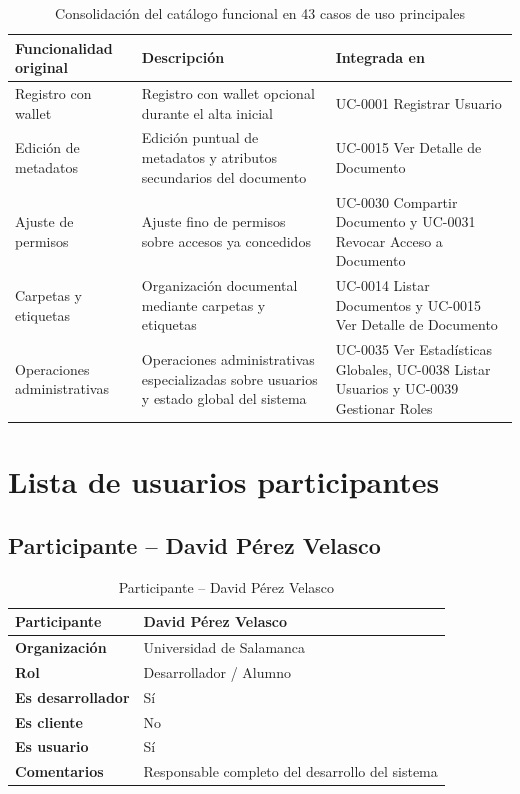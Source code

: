 \documentclass[11pt, a4paper]{article}
\begin{document}
\begin{table}[H]
    \centering
    \small
    \begin{tabular}{|p{2.6cm}|p{6.0cm}|p{5.0cm}|}
    \hline
    \textbf{Funcionalidad original} & \textbf{Descripción} & \textbf{Integrada en} \\
    \hline
    Registro con wallet & Registro con wallet opcional durante el alta inicial & UC-0001 Registrar Usuario \\
    \hline
    Edición de metadatos & Edición puntual de metadatos y atributos secundarios del documento & UC-0015 Ver Detalle de Documento \\
    \hline
    Ajuste de permisos & Ajuste fino de permisos sobre accesos ya concedidos & UC-0030 Compartir Documento y UC-0031 Revocar Acceso a Documento \\
    \hline
    Carpetas y etiquetas & Organización documental mediante carpetas y etiquetas & UC-0014 Listar Documentos y UC-0015 Ver Detalle de Documento \\
    \hline
    Operaciones administrativas & Operaciones administrativas especializadas sobre usuarios y estado global del sistema & UC-0035 Ver Estadísticas Globales, UC-0038 Listar Usuarios y UC-0039 Gestionar Roles \\
    \hline
    \end{tabular}
    \caption{Consolidación del catálogo funcional en 43 casos de uso principales}
    \label{tab:consolidacion-uc}
\end{table}

\section{Lista de usuarios participantes}

\subsection{Participante -- David Pérez Velasco}

\begin{table}[H]
    \centering
    \small
    \begin{tabular}{|p{4cm}|p{10cm}|}
    \hline
    \textbf{Participante} & David Pérez Velasco \\
    \hline
    \textbf{Organización} & Universidad de Salamanca \\
    \hline
    \textbf{Rol} & Desarrollador / Alumno \\
    \hline
    \textbf{Es desarrollador} & Sí \\
    \hline
    \textbf{Es cliente} & No \\
    \hline
    \textbf{Es usuario} & Sí \\
    \hline
    \textbf{Comentarios} & Responsable completo del desarrollo del sistema \\
    \hline
    \end{tabular}
    \caption{Participante -- David Pérez Velasco}
\end{table}
\end{document}
